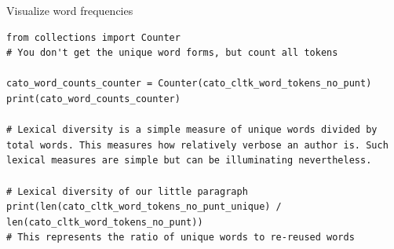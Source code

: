 \documentclass[10pt]{beamer}
\begin{document}
\begin{frame}{Visualize word frequencies} 
\begin{verbatim}
from collections import Counter
# You don't get the unique word forms, but count all tokens

cato_word_counts_counter = Counter(cato_cltk_word_tokens_no_punt)
print(cato_word_counts_counter)

# Lexical diversity is a simple measure of unique words divided by total words. This measures how relatively verbose an author is. Such lexical measures are simple but can be illuminating nevertheless. 

# Lexical diversity of our little paragraph
print(len(cato_cltk_word_tokens_no_punt_unique) / len(cato_cltk_word_tokens_no_punt))
# This represents the ratio of unique words to re-reused words
\end{verbatim}
\end{frame}
\end{document}
